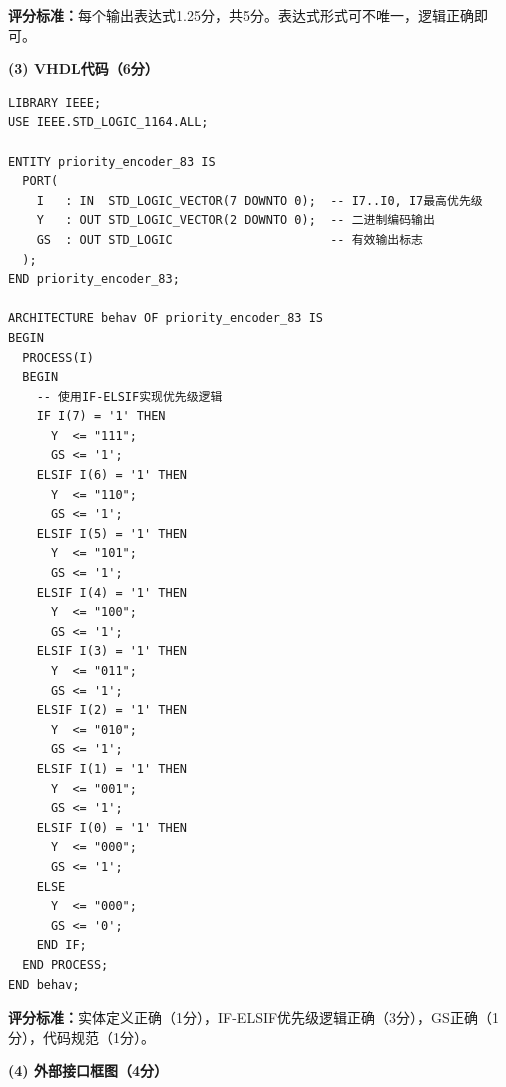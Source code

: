 \textbf{评分标准：}每个输出表达式1.25分，共5分。表达式形式可不唯一，逻辑正确即可。

\vspace{0.3cm}

\textbf{(3) VHDL代码（6分）}

\begin{lstlisting}[caption={8线--3线优先编码器VHDL代码}]
LIBRARY IEEE;
USE IEEE.STD_LOGIC_1164.ALL;

ENTITY priority_encoder_83 IS
  PORT(
    I   : IN  STD_LOGIC_VECTOR(7 DOWNTO 0);  -- I7..I0, I7最高优先级
    Y   : OUT STD_LOGIC_VECTOR(2 DOWNTO 0);  -- 二进制编码输出
    GS  : OUT STD_LOGIC                      -- 有效输出标志
  );
END priority_encoder_83;

ARCHITECTURE behav OF priority_encoder_83 IS
BEGIN
  PROCESS(I)
  BEGIN
    -- 使用IF-ELSIF实现优先级逻辑
    IF I(7) = '1' THEN
      Y  <= "111";
      GS <= '1';
    ELSIF I(6) = '1' THEN
      Y  <= "110";
      GS <= '1';
    ELSIF I(5) = '1' THEN
      Y  <= "101";
      GS <= '1';
    ELSIF I(4) = '1' THEN
      Y  <= "100";
      GS <= '1';
    ELSIF I(3) = '1' THEN
      Y  <= "011";
      GS <= '1';
    ELSIF I(2) = '1' THEN
      Y  <= "010";
      GS <= '1';
    ELSIF I(1) = '1' THEN
      Y  <= "001";
      GS <= '1';
    ELSIF I(0) = '1' THEN
      Y  <= "000";
      GS <= '1';
    ELSE
      Y  <= "000";
      GS <= '0';
    END IF;
  END PROCESS;
END behav;
\end{lstlisting}

\textbf{评分标准：}实体定义正确（1分），IF-ELSIF优先级逻辑正确（3分），GS正确（1分），代码规范（1分）。

\vspace{0.3cm}

\textbf{(4) 外部接口框图（4分）}

\begin{center}
\end{center}

